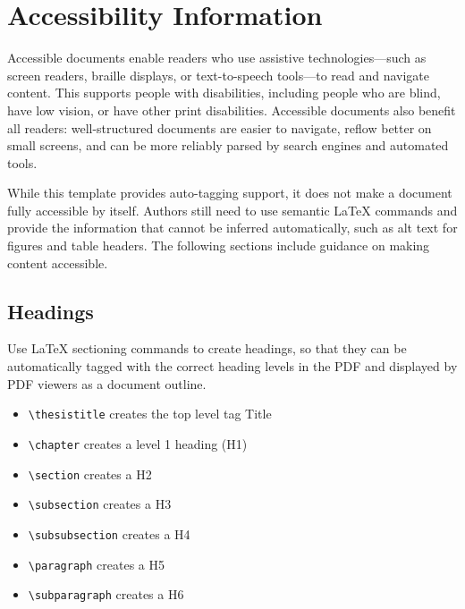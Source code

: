\chapter{Accessibility Information} \label{sec:chapter-2}

Accessible documents enable readers who use assistive technologies—such as screen readers, braille displays, or text-to-speech tools—to read and navigate content. This supports people with disabilities, including people who are blind, have low vision, or have other print disabilities. Accessible documents also benefit all readers: well-structured documents are easier to navigate, reflow better on small screens, and can be more reliably parsed by search engines and automated tools.

While this template provides auto-tagging support, it does not make a document fully accessible by itself. Authors still need to use semantic \LaTeX{} commands and provide the information that cannot be inferred automatically, such as alt text for figures and table headers. The following sections include guidance on making content accessible.

\section{Headings}

Use \LaTeX{} sectioning commands to create headings, so that they can be automatically tagged with the correct heading levels in the PDF and displayed by PDF viewers as a document outline.

\begin{itemize}
    \item \verb|\thesistitle| creates the top level tag Title
    \item \verb|\chapter| creates a level 1 heading (H1)
    \item \verb|\section| creates a H2
    \item \verb|\subsection| creates a H3
    \item \verb|\subsubsection| creates a H4
    \item \verb|\paragraph| creates a H5
    \item \verb|\subparagraph| creates a H6
\end{itemize}

